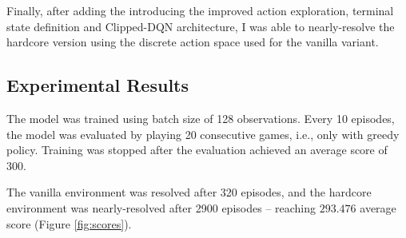 \documentclass{article}
\begin{document}
\begin{multicols}{2}
Finally, after adding the introducing the improved action exploration, terminal state definition and Clipped-DQN architecture, I was able to nearly-resolve the hardcore version using the discrete action space used for the vanilla variant.

\subsection{Experimental Results}
\label{section:results}
 The model was trained using batch size of 128 observations. Every 10 episodes, the model was evaluated by playing 20 consecutive games, i.e., only with greedy policy. Training was stopped after the evaluation achieved an average score of 300.
 
 The vanilla environment was resolved after 320 episodes, and the hardcore environment was nearly-resolved after 2900 episodes -- reaching $293.476$ average score (Figure \ref{fig:scores}).
 

\end{multicols}
\end{document}
